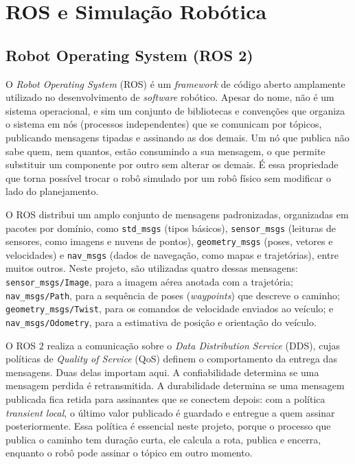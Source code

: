 \documentclass[
    12pt,
    openright,
    oneside,
    a4paper,
    english,
    brazil
]{abntex2}
\begin{document}
\section{ROS e Simulação Robótica}

\subsection{Robot Operating System (ROS 2)}
\label{sec:ros2}

O \emph{Robot Operating System} (ROS) \cite{quigley2009} é um \textit{framework} de código aberto amplamente utilizado no desenvolvimento de \textit{software} robótico. Apesar do nome, não é um sistema operacional, e sim um conjunto de bibliotecas e convenções que organiza o sistema em nós (processos independentes) que se comunicam por tópicos, publicando mensagens tipadas e assinando as dos demais. Um nó que publica não sabe quem, nem quantos, estão consumindo a sua mensagem, o que permite substituir um componente por outro sem alterar os demais. É essa propriedade que torna possível trocar o robô simulado por um robô físico sem modificar o lado do planejamento.

O ROS distribui um amplo conjunto de mensagens padronizadas, organizadas em pacotes por domínio, como \texttt{std\_msgs} (tipos básicos), \texttt{sensor\_msgs} (leituras de sensores, como imagens e nuvens de pontos), \texttt{geometry\_msgs} (poses, vetores e velocidades) e \texttt{nav\_msgs} (dados de navegação, como mapas e trajetórias), entre muitos outros. Neste projeto, são utilizadas quatro dessas mensagens: \texttt{sensor\_msgs/Image}, para a imagem aérea anotada com a trajetória; \texttt{nav\_msgs/Path}, para a sequência de poses (\textit{waypoints}) que descreve o caminho; \texttt{geometry\_msgs/Twist}, para os comandos de velocidade enviados ao veículo; e \texttt{nav\_msgs/Odometry}, para a estimativa de posição e orientação do veículo.

O ROS 2 realiza a comunicação sobre o \emph{Data Distribution Service} (DDS), cujas políticas de \emph{Quality of Service} (QoS) definem o comportamento da entrega das mensagens. Duas delas importam aqui. A confiabilidade determina se uma mensagem perdida é retransmitida. A durabilidade determina se uma mensagem publicada fica retida para assinantes que se conectem depois: com a política \textit{transient local}, o último valor publicado é guardado e entregue a quem assinar posteriormente. Essa política é essencial neste projeto, porque o processo que publica o caminho tem duração curta, ele calcula a rota, publica e encerra, enquanto o robô pode assinar o tópico em outro momento.
\end{document}
